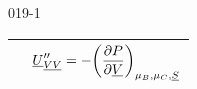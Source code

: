 \begin{mitframe}{019-1}
\begin{longtable}{ | c | c | }
     & $\uline{\intenergy}_{\uline{\vol} \uline{\vol}}^{\prime\prime} = -\bigg(\dfrac{\partial\p}{\partial\uline{\vol}}\bigg)_{\chempot_{\exergy},\chempot_{\conc},\uline{\entropy}}$ \\ \hline   
 
\end{longtable}		

\end{mitframe}